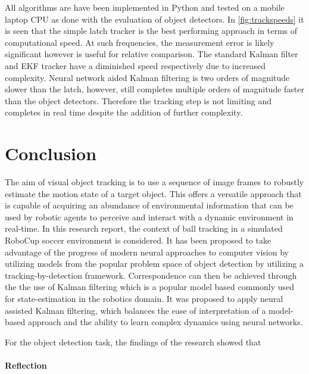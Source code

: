 \documentclass[a4paper,twoside,12pt]{report}
\begin{document}
All algorithms are have been implemented in Python and tested on a mobile laptop CPU as done with the evaluation of object detectors. In \ref{fig:trackspeeds} it is seen that the simple latch tracker is the best performing approach in terms of computational speed. At such frequencies, the measurement error is likely significant however is useful for relative comparison. The standard Kalman filter and EKF tracker have a diminished speed respectively due to increased complexity. Neural network aided Kalman filtering is two orders of magnitude slower than the latch, however, still completes multiple orders of magnitude faster than the object detectors. Therefore the tracking step is not limiting and completes in real time despite the addition of further complexity. 

\chapter{Conclusion}

The aim of visual object tracking is to use a sequence of image frames to robustly estimate the motion state of a target object. This offers a versatile approach that is capable of acquiring an abundance of environmental information that can be used by robotic agents to perceive and interact with a dynamic environment in real-time. In this research report, the context of ball tracking in a simulated RoboCup soccer environment is considered. It has been proposed to take advantage of the progress of modern neural approaches to computer vision by utilizing models from the popular problem space of object detection by utilizing a tracking-by-detection framework. Correspondence can then be achieved through the the use of Kalman filtering which is a popular model based commonly used for state-estimation in the robotics domain. It was proposed to apply neural assisted Kalman filtering, which balances the ease of interpretation of a model-based approach and the ability to learn complex dynamics using neural networks. 

For the object detection task, the findings of the research showed that


\subsubsection{Reflection}
\end{document}
